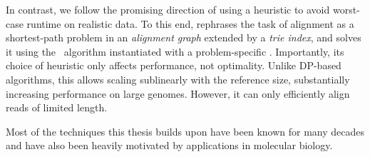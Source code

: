 In contrast, we follow the promising direction of using a heuristic to avoid
worst-case runtime on realistic data. To this end, \astarix rephrases the task
of alignment as a shortest-path problem in an \emph{alignment graph} extended by
a \emph{trie index}, and solves it using the \A~algorithm instantiated with a
problem-specific \prefixh. Importantly, its choice of heuristic only affects
performance, not optimality.
%
Unlike DP-based algorithms, this \prefixh allows scaling sublinearly with the
reference size, substantially increasing performance on large genomes. However,
it can only efficiently align reads of limited length.

Most of the techniques this thesis builds upon have been known for many decades
and have also been heavily motivated by applications in molecular biology. 